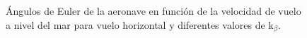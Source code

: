 \begin{figure}
	\centering
	\caption{Ángulos de Euler de la aeronave en función de la velocidad de vuelo a nivel del mar para vuelo horizontal y diferentes valores de k$_\beta$.}
	\label{EulerVHkbeta}
\end{figure}
